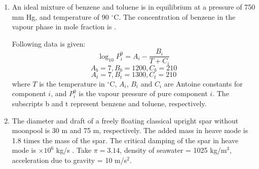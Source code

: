 \documentclass[journal,12pt,onecolumn]{IEEEtran}
\theoremstyle{remark}
\begin{document}
\begin{enumerate}
 \item An ideal mixture of benzene and toluene is in equilibrium at a pressure of 750 mm Hg, and temperature of 90 $^\circ$C. The concentration of benzene in the vapour phase in mole fraction is \underline{\hspace{1cm}} .

Following data is given:
\[
\log_{10} P_i^0 = A_i - \frac{B_i}{T + C_i}
\]
\[
A_b = 7, B_b = 1200, C_b = 210
\]
\[
A_t = 7, B_t = 1300, C_t = 210
\]
where $T$ is the temperature in $^\circ$C, $A_i$, $B_i$ and $C_i$ are Antoine constants for component $i$, and $P_i^0$ is the vapour pressure of pure component $i$. The subscripts b and t represent benzene and toluene, respectively.
\begin{enumerate}
\end{enumerate}
\hfill{}



 \item The diameter and draft of a freely floating classical upright spar without moonpool is 30 m and 75 m, respectively. The added mass in heave mode is 1.8 times the mass of the spar. The critical damping of the spar in heave mode is \underline{\hspace{1cm}} $\times 10^6$ kg/s . Take $\pi = 3.14$, density of seawater = 1025 kg/m$^3$, acceleration due to gravity = 10 m/s$^2$.
\begin{enumerate}
\end{enumerate}
\hfill{}




\end{enumerate}
\end{document}
